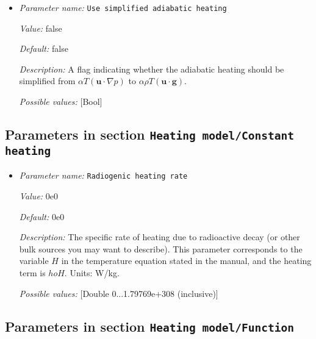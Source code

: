 \begin{itemize}
\item {\it Parameter name:} {\tt Use simplified adiabatic heating}
\label{parameters:Heating model/Adiabatic heating/Use simplified adiabatic heating}


{\it Value:} false


{\it Default:} false


{\it Description:} A flag indicating whether the adiabatic heating should be simplified from $\alpha T (\mathbf u \cdot \nabla p)$ to $ \alpha \rho T (\mathbf u \cdot \mathbf g) $.


{\it Possible values:} [Bool]
\end{itemize}

\subsection{Parameters in section \tt Heating model/Constant heating}
\label{parameters:Heating_20model/Constant_20heating}

\begin{itemize}
\item {\it Parameter name:} {\tt Radiogenic heating rate}
\label{parameters:Heating model/Constant heating/Radiogenic heating rate}


{\it Value:} 0e0


{\it Default:} 0e0


{\it Description:} The specific rate of heating due to radioactive decay (or other bulk sources you may want to describe). This parameter corresponds to the variable $H$ in the temperature equation stated in the manual, and the heating term is $
ho H$. Units: W/kg.


{\it Possible values:} [Double 0...1.79769e+308 (inclusive)]
\end{itemize}

\subsection{Parameters in section \tt Heating model/Function}
\label{parameters:Heating_20model/Function}

